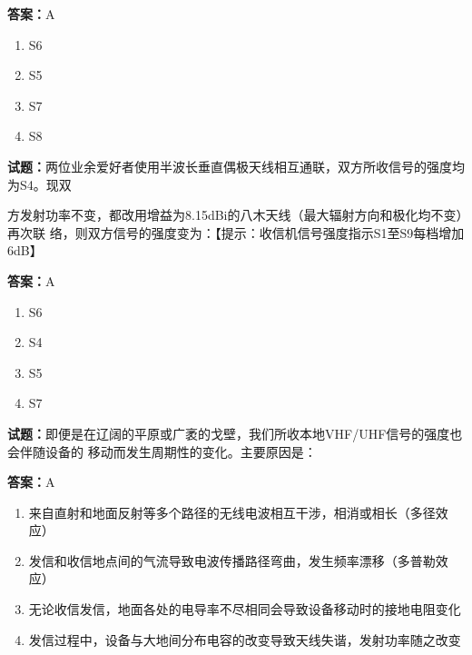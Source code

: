 \documentclass{ctexbook}
\begin{document}
\textbf{答案：}A 

\begin{enumerate}[leftmargin=3em]
  \item S6 

  \item S5 

  \item S7 

  \item S8 

\end{enumerate}





\vspace{1em}

\textbf{试题：}两位业余爱好者使用半波长垂直偶极天线相互通联，双方所收信号的强度均为S4。现双


方发射功率不变，都改用增益为8.15dBi的八木天线（最大辐射方向和极化均不变）再次联
络，则双方信号的强度变为：【提示：收信机信号强度指示S1至S9每档增加6dB】 

\textbf{答案：}A 

\begin{enumerate}[leftmargin=3em]
  \item S6 

  \item S4 

  \item S5 

  \item S7 

\end{enumerate}





\vspace{1em}

\textbf{试题：}即便是在辽阔的平原或广袤的戈壁，我们所收本地VHF/UHF信号的强度也会伴随设备的
移动而发生周期性的变化。主要原因是： 

\textbf{答案：}A 

\begin{enumerate}[leftmargin=3em]
  \item 来自直射和地面反射等多个路径的无线电波相互干涉，相消或相长（多径效应） 

  \item 发信和收信地点间的气流导致电波传播路径弯曲，发生频率漂移（多普勒效应） 

  \item 无论收信发信，地面各处的电导率不尽相同会导致设备移动时的接地电阻变化 

  \item 发信过程中，设备与大地间分布电容的改变导致天线失谐，发射功率随之改变 

\end{enumerate}
\end{document}
